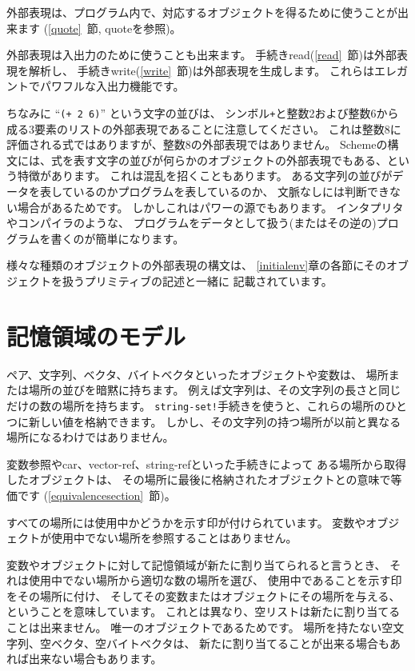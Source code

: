 外部表現は、プログラム内で、対応するオブジェクトを得るために使うことが出来ます
(\ref{quote}~節, {\cf quote}を参照)。

外部表現は入出力のために使うことも出来ます。
手続き{\cf read}(\ref{read}~節)は外部表現を解析し、
手続き{\cf write}(\ref{write}~節)は外部表現を生成します。
これらはエレガントでパワフルな入出力機能です。

ちなみに ``{\tt(+ 2 6)}'' という文字の並びは、
シンボル{\tt +}と整数2および整数6から成る3要素のリストの外部表現であることに注意してください。
これは整数8に評価される式ではありますが、整数8の外部表現ではありません。
Schemeの構文には、式を表す文字の並びが何らかのオブジェクトの外部表現でもある、という特徴があります。
これは混乱を招くこともあります。
ある文字列の並びがデータを表しているのかプログラムを表しているのか、
文脈なしには判断できない場合があるためです。
しかしこれはパワーの源でもあります。
インタプリタやコンパイラのような、
プログラムをデータとして扱う(またはその逆の)プログラムを書くのが簡単になります。

様々な種類のオブジェクトの外部表現の構文は、
\ref{initialenv}章の各節にそのオブジェクトを扱うプリミティブの記述と一緒に
記載されています。

\section{記憶領域のモデル}
\label{storagemodel}

ペア、文字列、ベクタ、バイトベクタといったオブジェクトや変数は、
場所または場所の並びを暗黙に持ちます。
例えば文字列は、その文字列の長さと同じだけの数の場所を持ちます。
{\tt string-set!}手続きを使うと、これらの場所のひとつに新しい値を格納できます。
しかし、その文字列の持つ場所が以前と異なる場所になるわけではありません。

変数参照や{\cf car}、{\cf vector-ref}、{\cf string-ref}といった手続きによって
ある場所から取得したオブジェクトは、
その場所に最後に格納されたオブジェクトとの意味で等価です
(\ref{equivalencesection}~節)。

すべての場所には使用中かどうかを示す印が付けられています。
変数やオブジェクトが使用中でない場所を参照することはありません。

変数やオブジェクトに対して記憶領域が新たに割り当てられると言うとき、
それは使用中でない場所から適切な数の場所を選び、
使用中であることを示す印をその場所に付け、
そしてその変数またはオブジェクトにその場所を与える、
ということを意味しています。
これとは異なり、空リストは新たに割り当てることは出来ません。
唯一のオブジェクトであるためです。
場所を持たない空文字列、空ベクタ、空バイトベクタは、
新たに割り当てることが出来る場合もあれば出来ない場合もあります。

